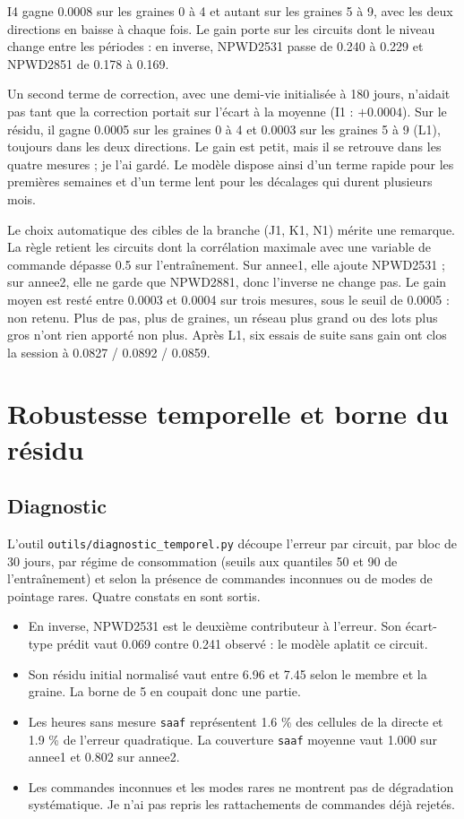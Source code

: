 \documentclass[11pt,a4paper]{article}
\newcommand{\code}[1]{\texttt{#1}}
\begin{document}
I4 gagne 0.0008 sur les graines 0 à 4 et autant sur les graines 5 à 9, avec les deux directions en baisse à chaque fois. Le gain porte sur les circuits dont le niveau change entre les périodes : en inverse, NPWD2531 passe de 0.240 à 0.229 et NPWD2851 de 0.178 à 0.169.

Un second terme de correction, avec une demi-vie initialisée à 180 jours, n'aidait pas tant que la correction portait sur l'écart à la moyenne (I1 : $+0.0004$). Sur le résidu, il gagne 0.0005 sur les graines 0 à 4 et 0.0003 sur les graines 5 à 9 (L1), toujours dans les deux directions. Le gain est petit, mais il se retrouve dans les quatre mesures ; je l'ai gardé. Le modèle dispose ainsi d'un terme rapide pour les premières semaines et d'un terme lent pour les décalages qui durent plusieurs mois.

Le choix automatique des cibles de la branche (J1, K1, N1) mérite une remarque. La règle retient les circuits dont la corrélation maximale avec une variable de commande dépasse 0.5 sur l'entraînement. Sur annee1, elle ajoute NPWD2531 ; sur annee2, elle ne garde que NPWD2881, donc l'inverse ne change pas. Le gain moyen est resté entre 0.0003 et 0.0004 sur trois mesures, sous le seuil de 0.0005 : non retenu. Plus de pas, plus de graines, un réseau plus grand ou des lots plus gros n'ont rien apporté non plus. Après L1, six essais de suite sans gain ont clos la session à 0.0827 / 0.0892 / 0.0859.

\section{Robustesse temporelle et borne du résidu}

\subsection{Diagnostic}

L'outil \code{outils/diagnostic\_temporel.py} découpe l'erreur par circuit, par bloc de 30 jours, par régime de consommation (seuils aux quantiles 50 et 90 de l'entraînement) et selon la présence de commandes inconnues ou de modes de pointage rares. Quatre constats en sont sortis.

\begin{itemize}
  \item En inverse, NPWD2531 est le deuxième contributeur à l'erreur. Son écart-type prédit vaut 0.069 contre 0.241 observé : le modèle aplatit ce circuit.
  \item Son résidu initial normalisé vaut entre 6.96 et 7.45 selon le membre et la graine. La borne de 5 en coupait donc une partie.
  \item Les heures sans mesure \code{saaf} représentent 1.6 \% des cellules de la directe et 1.9 \% de l'erreur quadratique. La couverture \code{saaf} moyenne vaut 1.000 sur annee1 et 0.802 sur annee2.
  \item Les commandes inconnues et les modes rares ne montrent pas de dégradation systématique. Je n'ai pas repris les rattachements de commandes déjà rejetés.
\end{itemize}
\end{document}
